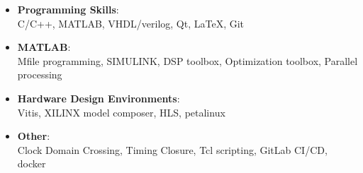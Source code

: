 
\begin{itemize}
	\item \textbf{Programming Skills}:
	\\ C/C++, MATLAB, VHDL/verilog, Qt, \LaTeX,   Git
	\item \textbf{MATLAB}:
 	\\ \quad Mfile programming, SIMULINK, DSP toolbox, Optimization toolbox, Parallel processing 
	\item \textbf{Hardware Design Environments}:
 	\\ \quad Vitis, XILINX model composer, HLS, petalinux
	\item \textbf{Other}:
	\\ \quad Clock Domain Crossing, Timing Closure, Tcl scripting, GitLab CI/CD, docker
\end{itemize}